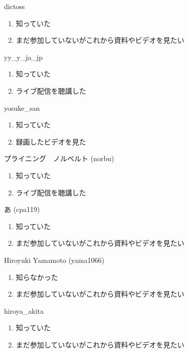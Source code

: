 \begin{prework}{ dictoss }
  \begin{enumerate}
  \item 知っていた
  \item まだ参加していないがこれから資料やビデオを見たい
  \end{enumerate}
\end{prework}

\begin{prework}{ yy\_y\_ja\_jp }
  \begin{enumerate}
  \item 知っていた
  \item ライブ配信を聴講した
  \end{enumerate}
\end{prework}

\begin{prework}{ yosuke\_san }
  \begin{enumerate}
  \item 知っていた
  \item 録画したビデオを見た
  \end{enumerate}
\end{prework}

\begin{prework}{ プライニング　ノルベルト (norbu) }
  \begin{enumerate}
  \item 知っていた
  \item ライブ配信を聴講した
  \end{enumerate}
\end{prework}

\begin{prework}{ あ (cpa119) }
  \begin{enumerate}
  \item 知っていた
  \item まだ参加していないがこれから資料やビデオを見たい
  \end{enumerate}
\end{prework}

\begin{prework}{ Hiroyuki Yamamoto (yama1066) }
  \begin{enumerate}
  \item 知らなかった
  \item まだ参加していないがこれから資料やビデオを見たい
  \end{enumerate}
\end{prework}

\begin{prework}{ hiroya\_akita }
  \begin{enumerate}
  \item 知っていた
  \item まだ参加していないがこれから資料やビデオを見たい
  \end{enumerate}
\end{prework}


